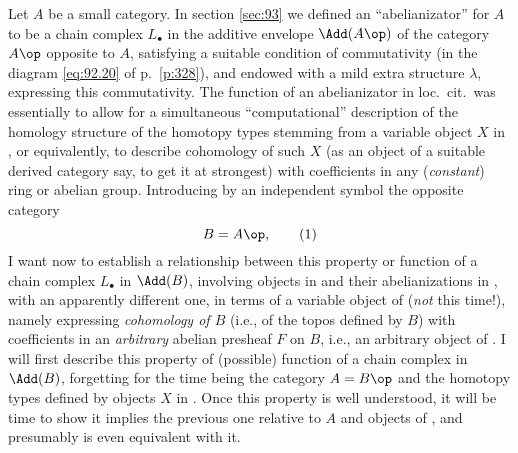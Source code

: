 Let $A$ be a small category. In section \ref{sec:93} we defined an
``abelianizator'' for $A$ to be a chain complex $L_\bullet$ in the
additive envelope $\Add(A\op)$ of the category $A\op$ opposite to $A$,
satisfying a suitable condition of commutativity (in the diagram
\eqref{eq:92.20} of p.\ \ref{p:328}), and endowed with a mild extra
structure $\lambda$, expressing this commutativity. The function of an
abelianizator in loc.\ cit.\ was essentially to allow for a
simultaneous ``computational'' description of the homology structure
of the homotopy types stemming from a variable object $X$ in \Ahat, or
equivalently, to describe cohomology of such $X$ (as an object of a
suitable derived category say, to get it at strongest) with
coefficients in any (\emph{constant}) ring or abelian
group. Introducing by an independent symbol the opposite category
\begin{equation}
  \label{eq:99.1}
  B=A\op,\tag{1}
\end{equation}
I want now to establish a relationship between this property or
function of a chain complex $L_\bullet$ in $\Add(B)$, involving
objects in \Ahat{} and their abelianizations in \Ahatab, with an
apparently different one, in terms of a variable object of \Bhatab{}
(\emph{not} \Ahatab{} this time!), namely expressing \emph{cohomology
  of $B$} (i.e., of the topos \Bhat{} defined by $B$) with
coefficients in an \emph{arbitrary} abelian presheaf $F$ on $B$, i.e.,
an arbitrary object of \Bhatab. I will first describe this
property of (possible) function of a chain complex in $\Add(B)$,
forgetting for the time being the category $A=B\op$ and the homotopy
types defined by objects $X$ in \Ahat. Once this property is well
understood, it will be time to show it implies the previous one
relative to $A$ and objects of \Ahat, and presumably is even
equivalent with it.

